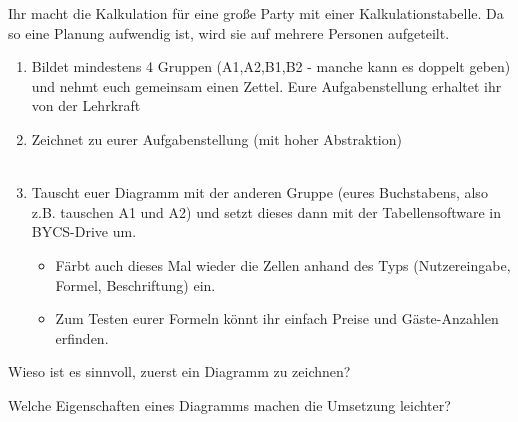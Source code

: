 {
    Ihr macht die Kalkulation für eine große Party mit einer Kalkulationstabelle. Da so eine Planung aufwendig ist, wird sie auf mehrere Personen aufgeteilt.
    \begin{enumerate}
        \item Bildet mindestens 4 Gruppen (A1,A2,B1,B2 - manche kann es doppelt geben) und nehmt euch gemeinsam einen Zettel. Eure Aufgabenstellung erhaltet ihr von der Lehrkraft 
        \item Zeichnet zu eurer Aufgabenstellung  (mit hoher Abstraktion)\\
            \\
        \item Tauscht euer Diagramm mit der anderen Gruppe (eures Buchstabens, also z.B. tauschen A1 und A2) und setzt dieses dann mit der Tabellensoftware in BYCS-Drive um. \begin{itemize}
        \item Färbt auch dieses Mal wieder die Zellen anhand des Typs (Nutzereingabe, Formel, Beschriftung) ein.
            \item Zum Testen eurer Formeln könnt ihr einfach Preise und Gäste-Anzahlen erfinden.
        \end{itemize}
    \end{enumerate}

    Wieso ist es sinnvoll, zuerst ein Diagramm zu zeichnen?



    Welche Eigenschaften eines Diagramms machen die Umsetzung leichter?

}
